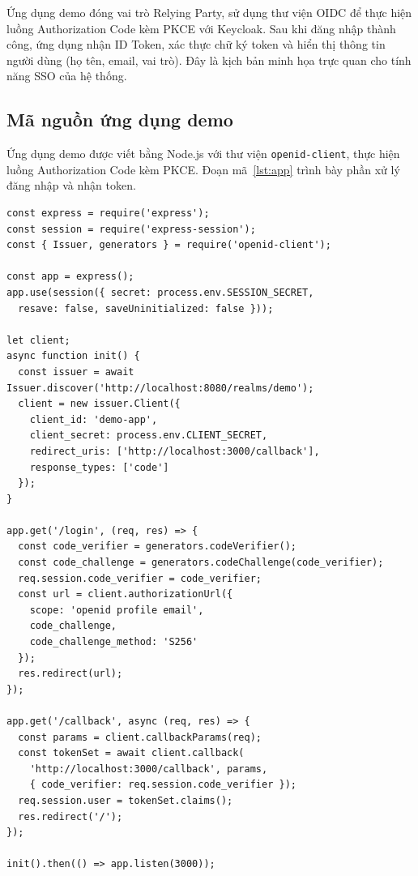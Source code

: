 Ứng dụng demo đóng vai trò Relying Party, sử dụng thư viện OIDC để thực hiện
luồng Authorization Code kèm PKCE với Keycloak. Sau khi đăng nhập thành công,
ứng dụng nhận ID Token, xác thực chữ ký token và hiển thị thông tin người dùng
(họ tên, email, vai trò). Đây là kịch bản minh họa trực quan cho tính năng SSO
của hệ thống.


\subsection{Mã nguồn ứng dụng demo}
\label{subsec:appcode}

Ứng dụng demo được viết bằng Node.js với thư viện \texttt{openid-client}, thực
hiện luồng Authorization Code kèm PKCE. Đoạn mã~\ref{lst:app} trình bày phần
xử lý đăng nhập và nhận token.

\begin{lstlisting}[caption={Xu ly dang nhap OIDC trong ung dung demo (Node.js)},label={lst:app}]
const express = require('express');
const session = require('express-session');
const { Issuer, generators } = require('openid-client');

const app = express();
app.use(session({ secret: process.env.SESSION_SECRET,
  resave: false, saveUninitialized: false }));

let client;
async function init() {
  const issuer = await Issuer.discover('http://localhost:8080/realms/demo');
  client = new issuer.Client({
    client_id: 'demo-app',
    client_secret: process.env.CLIENT_SECRET,
    redirect_uris: ['http://localhost:3000/callback'],
    response_types: ['code']
  });
}

app.get('/login', (req, res) => {
  const code_verifier = generators.codeVerifier();
  const code_challenge = generators.codeChallenge(code_verifier);
  req.session.code_verifier = code_verifier;
  const url = client.authorizationUrl({
    scope: 'openid profile email',
    code_challenge,
    code_challenge_method: 'S256'
  });
  res.redirect(url);
});

app.get('/callback', async (req, res) => {
  const params = client.callbackParams(req);
  const tokenSet = await client.callback(
    'http://localhost:3000/callback', params,
    { code_verifier: req.session.code_verifier });
  req.session.user = tokenSet.claims();
  res.redirect('/');
});

init().then(() => app.listen(3000));
\end{lstlisting}

